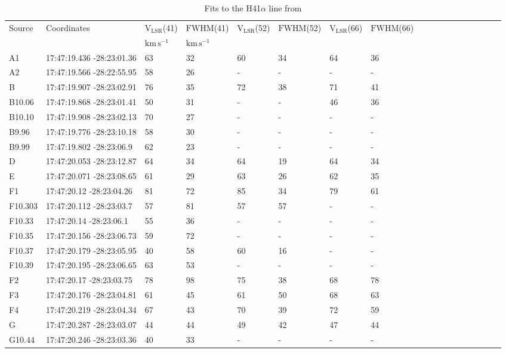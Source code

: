 \begin{table}[p]
\begin{minipage}{170mm}
\caption{Fits to the H41$\alpha$ line from \citet{Ginsburg2018a}}
\begin{tabular}{llllllllllllllllll}
\label{tab:h41afits}
Source & Coordinates & V$_\mathrm{LSR}$(41) & $\mathrm{FWHM}$(41) & V$_\mathrm{LSR}$(52) & $\mathrm{FWHM}$(52) & V$_\mathrm{LSR}$(66) & $\mathrm{FWHM}$(66) \\
 &  & $\mathrm{km\,s^{-1}}$ & $\mathrm{km\,s^{-1}}$ &  &  &  &  \\
\hline
A1 & 17:47:19.436 -28:23:01.36 & 63 & 32 & 60 & 34 & 64 & 36 \\
A2 & 17:47:19.566 -28:22:55.95 & 58 & 26 & - & - & - & - \\
B & 17:47:19.907 -28:23:02.91 & 76 & 35 & 72 & 38 & 71 & 41 \\
B10.06 & 17:47:19.868 -28:23:01.41 & 50 & 31 & - & - & 46 & 36 \\
B10.10 & 17:47:19.908 -28:23:02.13 & 70 & 27 & - & - & - & - \\
B9.96 & 17:47:19.776 -28:23:10.18 & 58 & 30 & - & - & - & - \\
B9.99 & 17:47:19.802 -28:23:06.9 & 62 & 23 & - & - & - & - \\
D & 17:47:20.053 -28:23:12.87 & 64 & 34 & 64 & 19 & 64 & 34 \\
E & 17:47:20.071 -28:23:08.65 & 61 & 29 & 63 & 26 & 62 & 35 \\
F1 & 17:47:20.12 -28:23:04.26 & 81 & 72 & 85 & 34 & 79 & 61 \\
F10.303 & 17:47:20.112 -28:23:03.7 & 57 & 81 & 57 & 57 & - & - \\
F10.33 & 17:47:20.14 -28:23:06.1 & 55 & 36 & - & - & - & - \\
F10.35 & 17:47:20.156 -28:23:06.73 & 59 & 72 & - & - & - & - \\
F10.37 & 17:47:20.179 -28:23:05.95 & 40 & 58 & 60 & 16 & - & - \\
F10.39 & 17:47:20.195 -28:23:06.65 & 63 & 53 & - & - & - & - \\
F2 & 17:47:20.17 -28:23:03.75 & 78 & 98 & 75 & 38 & 68 & 78 \\
F3 & 17:47:20.176 -28:23:04.81 & 61 & 45 & 61 & 50 & 68 & 63 \\
F4 & 17:47:20.219 -28:23:04.34 & 67 & 43 & 70 & 39 & 72 & 59 \\
G & 17:47:20.287 -28:23:03.07 & 44 & 44 & 49 & 42 & 47 & 44 \\
G10.44 & 17:47:20.246 -28:23:03.36 & 40 & 33 & - & - & - & - \\

\end{tabular}
\end{minipage}
\end{table}
